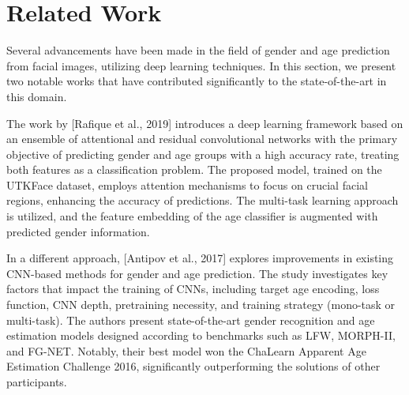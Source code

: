 \section{Related Work} \label{sec:related_work}
Several advancements have been made in the field of gender
and age prediction from facial images, utilizing deep learning techniques.
In this section, we present two notable works that have contributed
significantly to the state-of-the-art in this domain.

The work by [Rafique et al., 2019] \cite{rel1} introduces a deep learning
framework based on an ensemble of attentional and residual convolutional
networks with the primary objective of predicting gender and age groups
with a high accuracy rate, treating both features as a classification problem.
The proposed model, trained on the UTKFace dataset,
employs attention mechanisms to focus on
crucial facial regions, enhancing the accuracy of predictions. 
The multi-task learning approach is utilized, and the feature embedding
of the age classifier is augmented with predicted gender information.

In a different approach, [Antipov et al., 2017] \cite{rel2} explores
improvements in existing CNN-based methods for gender and age prediction.
The study investigates key factors that impact the training of
CNNs, including target age encoding, loss function,
CNN depth, pretraining necessity, and training strategy
(mono-task or multi-task).
The authors present state-of-the-art gender recognition and
age estimation models designed according to benchmarks such as
LFW, MORPH-II, and FG-NET.
Notably, their best model won the ChaLearn Apparent Age
Estimation Challenge 2016, significantly
outperforming the solutions of other participants.